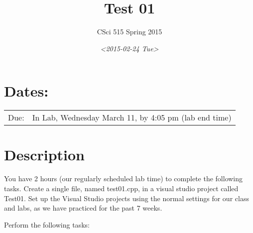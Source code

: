 \documentclass[11pt]{article}
\author{CSci 515 Spring 2015}
\date{\textit{<2015-02-24 Tue>}}
\title{Test 01}
\begin{document}
\maketitle

\section*{Dates:}
\label{sec-1}
\begin{center}
\begin{tabular}{ll}
Due: & In Lab, Wednesday March 11, by 4:05 pm (lab end time)\\
\end{tabular}
\end{center}
\section*{Description}
\label{sec-2}
You have 2 hours (our regularly scheduled lab time) to complete the
following tasks.  Create a single file, named test01.cpp, in a visual
studio project called Test01.  Set up the Visual Studio projects using
the normal settings for our class and labs, as we have practiced for
the past 7 weeks. 

Perform the following tasks:
\end{document}
